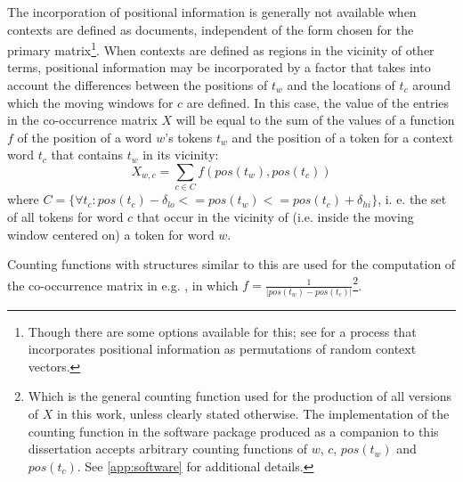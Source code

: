 The incorporation of positional information is generally not available when contexts are defined as documents, independent of the form chosen for the primary matrix\footnote{
    Though there are some options available for this; see \citet{sahlgren2008,recchia2015} for a process that incorporates positional information as permutations of random context vectors.
}.
When contexts are defined as regions in the vicinity of other terms, positional information may be incorporated by a factor that takes into account the differences between the positions of $t_w$ and the locations of $t_c$ around which the moving windows for $c$ are defined.
In this case, the value of the entries in the co-occurrence matrix $X$ will be equal to the sum of the values of a function $f$ of the position of a word $w$'s tokens $t_w$ and the position of a token for a context word $t_c$ that contains $t_w$ in its vicinity:
\[
    X_{w,c} = \sum_{ c \in C } f( pos( t_w ), pos( t_c ) )
\]
where $C = \{ \forall t_c : pos( t_c ) - \delta_{lo} <= pos( t_w ) <= pos( t_c ) + \delta_{hi} \}$, i. e. the set of all tokens for word $c$ that occur in the vicinity of (i.e. inside the moving window centered on) a token for word $w$.

Counting functions with structures similar to this are used for the computation of the co-occurrence matrix in e.g. \citet{pennington2014}, in which $f = \frac{1}{|pos( t_w ) - pos( t_c )|}$\footnote{
    Which is the general counting function used for the production of all versions of $X$ in this work, unless clearly stated otherwise.
    The implementation of the counting function in the software package produced as a companion to this dissertation accepts arbitrary counting functions of $w$, $c$, $pos(t_w)$ and $pos(t_c)$.
    See \autoref{app:software} for additional details.
}.

